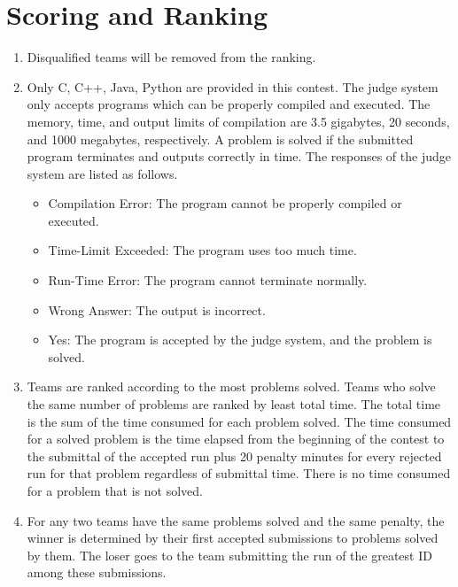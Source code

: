 \section*{Scoring and Ranking}
\begin{enumerate}
\item Disqualified teams will be removed from the ranking.
\item Only C, C++, Java, Python are provided in this contest. 
The judge system only accepts programs which can be properly compiled and 
executed. The memory, time, and output limits of compilation are 3.5 gigabytes,
20 seconds, and 1000 megabytes, respectively.
A problem is solved if the submitted program terminates and outputs correctly in time. The responses of the judge system are listed as follows.
{	\setlength{\parskip}{1pt}
	\begin{itemize}
    \item Compilation Error: The program cannot be properly compiled or executed. 
    \item Time-Limit Exceeded: The program uses too much time.
    \item Run-Time Error: The program cannot terminate normally.
    \item Wrong Answer: The output is incorrect.
    \item Yes: The program is accepted by the judge system, and the problem is solved.
    \end{itemize}
}
\item Teams are ranked according to the most problems solved. Teams who solve the same number of problems are ranked by least total time. The total time is the sum of the time consumed for each problem solved. The time consumed for a solved problem is the time elapsed from the beginning of the contest to the submittal of the accepted run plus 20 penalty minutes for every rejected run for that problem regardless of submittal time. There is no time consumed for a problem that is not solved.

\item For any two teams have the same problems solved and the same penalty, 
the winner is determined by their first accepted submissions to problems solved
by them. The loser goes to the team submitting the run of the greatest 
ID among these submissions.
\end{enumerate}

\newpage
